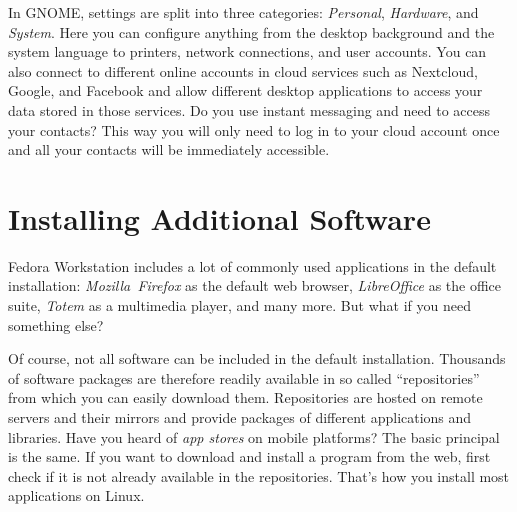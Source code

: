 \begin{enumerate}
In GNOME, settings are split into three categories: \emph{Personal}, \emph{Hardware}, and \emph{System}. Here you can configure anything from the desktop background and the system language to printers, network connections, and user accounts. You can also connect to different online accounts in cloud services such as Nextcloud, Google, and Facebook and allow different desktop applications to access your data stored in those services. Do you use instant messaging and need to access your contacts? This way you will only need to log in to your cloud account once and all your contacts will be immediately accessible.
\end{enumerate}

\section*{Installing Additional Software}

Fedora Workstation includes a lot of commonly used applications in the default installation: \emph{Mozilla~Firefox} as the default web browser, \emph{LibreOffice} as the office suite, \emph{Totem} as a multimedia player, and many more. But what if you need something else?

Of course, not all software can be included in the default installation. Thousands of software packages are therefore readily available in so called \enquote{repositories} from which you can easily download them. Repositories are hosted on remote servers and their mirrors and provide packages of different applications and libraries. Have you heard of \emph{app stores} on mobile platforms? The basic principal is the same. If you want to download and install a program from the web, first check if it is not already available in the repositories. That's how you install most applications on Linux.


